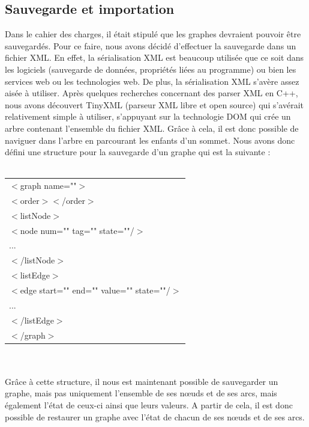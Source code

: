 \documentclass[11pt,a4paper]{article}
\begin{document}
		\subsection{Sauvegarde et importation}
			Dans le cahier des charges, il était stipulé que les graphes devraient pouvoir être sauvegardés. Pour ce faire, nous avons décidé d'effectuer la sauvegarde dans un fichier XML. En effet, la sérialisation XML est beaucoup utilisée que ce soit dans les logiciels (sauvegarde de données, propriétés liées au programme) ou bien les services web ou les technologies web. De plus, la sérialisation XML s'avère assez aisée à utiliser.
			Après quelques recherches concernant des parser XML en C++, nous avons découvert TinyXML (parseur XML libre et open source) qui s'avérait relativement simple à utiliser, s'appuyant sur la technologie DOM qui crée un arbre contenant l'ensemble du fichier XML. Grâce à cela, il est donc possible de naviguer dans l'arbre en parcourant les enfants d'un sommet. Nous avons donc défini une structure pour la sauvegarde d'un graphe qui est la suivante : \\\\
			\begin{tabular}{|l|}
				\hline 
				$<$graph name=""$>$ \\
 					\indent$<$order$><$/order$>$ \\
					\indent$<$listNode$>$ \\
						\indent\indent$<$node num="" tag="" state=""/$>$ \\
						\indent\indent...\\
					\indent$<$/listNode$>$\\
					\indent$<$listEdge$>$\\
						\indent\indent$<$edge start="" end="" value="" state=""/$>$\\
						\indent\indent...\\
					\indent$<$/listEdge$>$\\
				$<$/graph$>$\\
				\hline 
			\end{tabular}  
			\\\\
		Grâce à cette structure, il nous est maintenant possible de sauvegarder un graphe, mais pas uniquement l'ensemble de ses n\oe uds et de ses arcs, mais également l'état de ceux-ci ainsi que leurs valeurs. A partir de cela, il est donc possible de restaurer un graphe avec l'état de chacun de ses n\oe uds et de ses arcs.	
			
\end{document}

